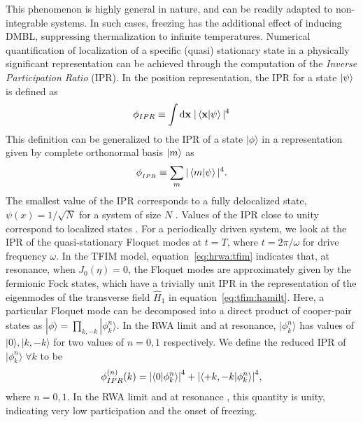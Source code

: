 \documentclass[%
reprint,
superscriptaddress,
amsmath,amssymb,
aps,
prb,
showkeys,
]{revtex4-2}
\begin{document}
	This phenomenon is highly general in nature, and can be readily adapted to non-integrable systems. In such cases, freezing has the additional effect of inducing DMBL, suppressing thermalization to infinite temperatures. Numerical quantification of localization of a specific (quasi) stationary state in a physically significant representation can be achieved through the computation of the \emph{Inverse Participation Ratio} (IPR).  In the position representation, the IPR for a state $\ket{\psi}$  \cite{mukherjee_modulation-assisted_2015,lin_many-body_2018,murphy_generalized_2011, torres-herrera_self-averaging_2020} is defined as
	\begin{equation*}
		\phi_{IPR}\equiv \int \mathrm{d}\mathbf{x}\;\vert\ip{\mathbf{x}}{\psi}\vert^4
	\end{equation*}
	This definition can be generalized to the IPR of a state $|\phi\rangle$ in a representation given by complete orthonormal basis $\ket{m}$ as 
	\begin{equation}
	\label{eq:ipr:defn}
	\phi_{{_{IPR}}} \equiv \sum_m\vert\ip{m}{\psi}\vert^4.
	\end{equation}
	The smallest value of the IPR corresponds to a fully delocalized state, $\psi(x)=1/\sqrt{N}$ for a system of size $N$ \cite{torres-herrera_self-averaging_2020,trivedi_can_2005}. Values of the IPR close to unity correspond to localized states \cite{misguich_inverse_2016}. For a periodically driven system, we look at the IPR of the quasi-stationary Floquet modes at $t=T$, where $t=2\pi/\omega$ for drive frequency $\omega$. In the TFIM model, equation~\ref{eq:hrwa:tfim} indicates that, at resonance, when $J_0(\eta)=0$, the Floquet modes are approximately given by the fermionic Fock states, which have a trivially unit IPR in the representation of the eigenmodes of the transverse field $\hat{H}_1$ in equation~\ref{eq:tfim:hamilt}. Here, a particular Floquet mode can be decomposed into a direct product of cooper-pair states as $|\phi\rangle = \prod_{k,-k}|\phi^n_k\rangle$. In the RWA limit and at resonance, $|\phi^n_k\rangle$ has values of $|0\rangle, |k,-k\rangle$ for two values of $n=0,1$ respectively. We define the reduced IPR of $|\phi^n_k\rangle\; \forall k$ to be
	\begin{equation}
	\label{eq:ipr:ising}
	\phi^{(n)}_{IPR}(k) = \abs{\ip{0}{\phi^n_k}}^4 + \abs{\ip{ +k, -k }{\phi^n_k}}^4,
	\end{equation}
	where $n=0,1$. In the RWA limit and at resonance , this quantity is unity, indicating very low participation and the onset of freezing.
\end{document}
